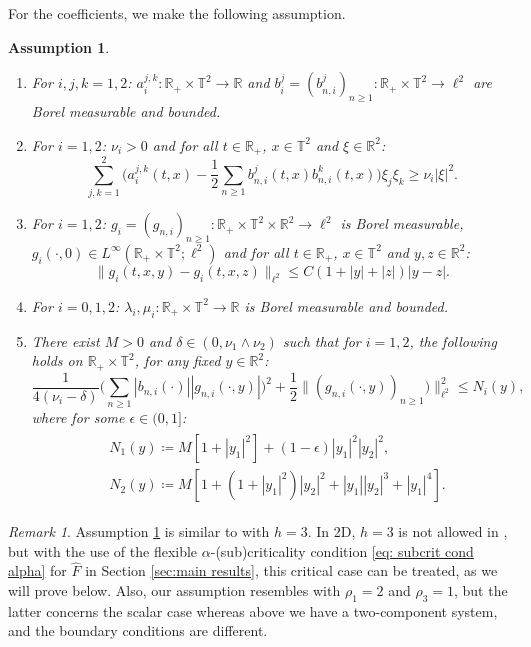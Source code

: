\documentclass{amsart}
\newcommand{\<}{\langle}
\newcommand{\?}{\rangle}
\newcommand{\ceqq}{\coloneqq}
\newcommand{\col}{\colon}
\newcommand{\Tor}{\mathbb{T}}
\renewcommand{\Tor}{\mathbb{T}^2}
\theoremstyle{plain}
\theoremstyle{remark}
\newtheorem{remark}[theorem]{Remark}
\theoremstyle{plain}
\newtheorem{assumption}[theorem]{Assumption}
\numberwithin{equation}{section}
\def\R{{\mathbb R}}
\begin{document}
For the coefficients, we make the following assumption.  
\begin{assumption}\label{ass:brusselator}   
  \begin{enumerate}[label=\textit{(\arabic*)},ref=\ref{ass:brusselator}\textit{(\arabic*)}]
  \item\label{it:ab} For $i,j,k=1,2$: $a_i^{j,k}\col \R_+\times  \Tor\to \R$ and $b_i^j=(b_{n,i}^j)_{n\geq 1}\col \R_+\times  \Tor\to \ell^2$ are Borel measurable and bounded.   
  \item\label{it:parab} For $i=1,2$: $\nu_i>0$ and for all $t\in\R_+$, $x\in\Tor$ and $\xi\in\R^2$:  
  \[
  \sum_{j,k= 1}^2 \Big(a_i^{j,k}(t,x)-\frac{1}{2}\sum_{n\geq 1}b_{n,i}^{j}(t,x)b_{n,i}^{k}(t,x)\Big)\xi_j\xi_k\geq \nu_i|\xi|^2.
  \]
  \item\label{it:g}  
  For $i=1,2$: $g_i=(g_{n,i})_{n\geq 1}\col \R_+\times \Tor \times \R^2\to \ell^2$ is Borel measurable, 
  $g_i(\cdot,0)\in L^\infty(\R_+\times \Tor;\ell^2)$  
  and for all $t\in\R_+$, $x\in\Tor$ and $y,z\in\R^2$: 
  \[
  \|g_i(t,x,y)-g_i(t,x,z)\|_{\ell^2}\leq C(1+|y|+|z|)|y-z|.
  \]   
  \item\label{it:alphabeta} For $i=0,1,2$: $\lambda_i,\mu_i\col \R_+\times \Tor\to \R$ is  Borel measurable and bounded. 
  \item\label{it:Bgrowth} There exist $M>0$ and $\delta \in(0,\nu_1\wedge\nu_2)$ such that for $i=1,2$, the following holds on $\R_+\times\Tor$, for any fixed $y\in \R^2$: 
      \[
        \frac{1}{4(\nu_i-\delta)}\Big(\sum_{n\geq 1}|b_{n,i}(\cdot)||g_{n,i}(\cdot,y)|\Big)^2
        +\frac{1}{2}\|(g_{n,i}(\cdot,y))_{n\geq 1})\|_{\ell^2}^2\leq N_i(y),
      \]
         where for some $\epsilon\in(0,1]$: 
        \begin{align}\label{eq:Ni}
        \begin{split}
          &N_1(y)\ceqq M[1+|y_1|^2]+(1-\epsilon)|y_1|^2|y_2|^2, \\
          &N_2(y)\ceqq M[1+(1+|y_1|^2)|y_2|^2+|y_1||y_2|^3+|y_1|^4].
          \end{split}
        \end{align} 
  \end{enumerate}
\end{assumption}

\begin{remark}
Assumption \ref{ass:brusselator} is similar to \cite[Asm.\ 2.1]{AVreac24} with $h=3$. In 2D, $h=3$ is not allowed in  \cite[Asm.\ 2.2(ii)]{AVreac24}, but with the use of the flexible $\alpha$-(sub)criticality condition \eqref{eq: subcrit cond alpha} for $\hat{F}$ in Section \ref{sec:main results}, this critical case can be treated, as we will prove below.  Also, our assumption resembles \cite[Asm.\ 8.1(1)(2)(3)]{BGV} with $\rho_1=2$ and $\rho_3=1$, but the latter concerns the scalar case whereas above we have a two-component system, and the boundary conditions are different. 
\end{remark}
\end{document}
